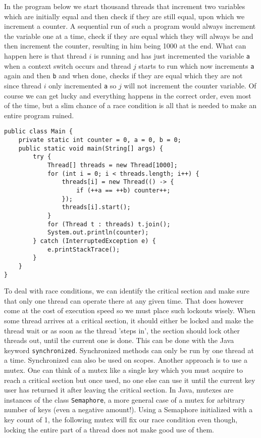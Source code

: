 In the program below we start thousand threads that increment two variables which are initially equal and then check if they are still equal, upon which we increment a counter. A sequential run of such a program would always increment the variable one at a time, check if they are equal which they will always be and then increment the counter, resulting in him being 1000 at the end. What can happen here is that thread $i$ is running and has just incremented the variable \texttt{a} when a context switch occurs and thread $j$ starts to run which now increments \texttt{a} again and then \texttt{b} and when done, checks if they are equal which they are not since thread $i$ only incremented \texttt{a} so $j$ will not increment the counter variable. Of course we can get lucky and everything happens in the correct order, even most of the time, but a slim chance of a race condition is all that is needed to make an entire program ruined.  
\begin{lstlisting}[style=A_Java]
public class Main {
    private static int counter = 0, a = 0, b = 0;
    public static void main(String[] args) {
        try {
            Thread[] threads = new Thread[1000];
            for (int i = 0; i < threads.length; i++) {
                threads[i] = new Thread(() -> {
                    if (++a == ++b) counter++;
                });
                threads[i].start();
            }
            for (Thread t : threads) t.join();
            System.out.println(counter);
        } catch (InterruptedException e) {
            e.printStackTrace();
        }
    }
}
\end{lstlisting}
To deal with race conditions, we can identify the critical section and make sure that only one thread can operate there at any given time. That does however come at the cost of execution speed so we must place such lockouts wisely. When some thread arrives at a critical section, it should either be locked and make the thread wait or as soon as the thread 'steps in', the section should lock other threads out, until the current one is done. This can be done with the Java keyword \verb!synchronized!. Synchronized methods can only be run by one thread at a time. Synchronized can also be used on scopes. Another approach is to use a mutex. One can think of a mutex like a single key which you must acquire to reach a critical section but once used, no one else can use it until the current key user has returned it after leaving the critical section. In Java, mutexes are instances of the class \texttt{Semaphore}, a more general case of a mutex for arbitrary number of keys (even a negative amount!). Using a Semaphore initialized with a key count of 1, the following mutex will fix our race condition even though, locking the entire part of a thread does not make good use of them.
